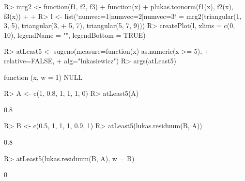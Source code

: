 \documentclass{article}\usepackage[]{graphicx}\usepackage[]{color}
\begin{document}
\begin{Schunk}
\begin{Sinput}
R> mrg2 <- function(f1, f2, f3) {
+      function(x) {
+          plukas.tconorm(f1(x), f2(x), f3(x))
+      }
+  }
R> l <- list(`numvec=1|numvec=2|numvec=3` = mrg2(triangular(1, 3, 5), triangular(3, 
+      5, 7), triangular(5, 7, 9)))
R> createPlot(l, xlims = c(0, 10), legendName = "", legendBottom = TRUE)
\end{Sinput}
\end{Schunk}

\begin{Schunk}
% --begin: "quant1"
\begin{Sinput}
R> atLeast5 <- sugeno(measure=function(x) as.numeric(x >= 5),
+                     relative=FALSE,
+                     alg="lukasiewicz")
R> args(atLeast5)
\end{Sinput}
\begin{Soutput}
function (x, w = 1) 
NULL
\end{Soutput}
%
% --end: "quant1"
\end{Schunk}

\begin{Schunk}
% --begin: "quant2"
\begin{Sinput}
R> A <- c(1, 0.8, 1, 1, 1, 0)
R> atLeast5(A)
\end{Sinput}
\begin{Soutput}
[1] 0.8
\end{Soutput}
%
% --end: "quant2"
\end{Schunk}

\begin{Schunk}
% --begin: "quant3"
\begin{Sinput}
R> B <- c(0.5, 1, 1, 1, 0.9, 1)
R> atLeast5(lukas.residuum(B, A))
\end{Sinput}
\begin{Soutput}
[1] 0.8
\end{Soutput}
%
% --end: "quant3"
\end{Schunk}

\begin{Schunk}
% --begin: "quant4"
\begin{Sinput}
R> atLeast5(lukas.residuum(B, A), w = B)
\end{Sinput}
\begin{Soutput}
[1] 0
\end{Soutput}
%
% --end: "quant4"
\end{Schunk}
\end{document}
